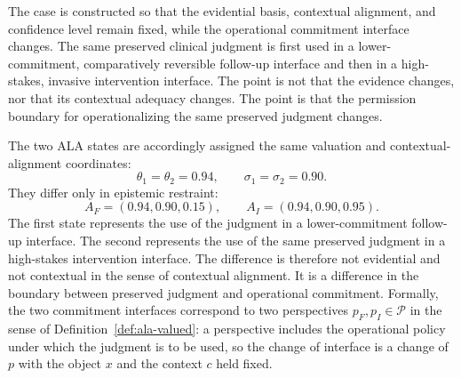 \documentclass[reqno,final]{amsart}
\theoremstyle{definition}
\theoremstyle{plain}
\theoremstyle{remark}
\begin{document}
The case is constructed so that the evidential basis, contextual alignment, and confidence level remain fixed, while the operational commitment interface changes. The same preserved clinical judgment is first used in a lower-commitment, comparatively reversible follow-up interface and then in a high-stakes, invasive intervention interface. The point is not that the evidence changes, nor that its contextual adequacy changes. The point is that the permission boundary for operationalizing the same preserved judgment changes.

The two ALA states are accordingly assigned the same valuation and contextual-alignment coordinates:
\[
\theta_1=\theta_2=0.94,
\qquad
\sigma_1=\sigma_2=0.90.
\]
They differ only in epistemic restraint:
\[
A_F=(0.94,0.90,0.15),
\qquad
A_I=(0.94,0.90,0.95).
\]
The first state represents the use of the judgment in a lower-commitment follow-up interface. The second represents the use of the same preserved judgment in a high-stakes intervention interface. The difference is therefore not evidential and not contextual in the sense of contextual alignment. It is a difference in the boundary between preserved judgment and operational commitment. Formally, the two commitment interfaces correspond to two perspectives \(p_{F},p_{I}\in\mathcal{P}\) in the sense of Definition~\ref{def:ala-valued}: a perspective includes the operational policy under which the judgment is to be used, so the change of interface is a change of \(p\) with the object \(x\) and the context \(c\) held fixed.

\end{document}
